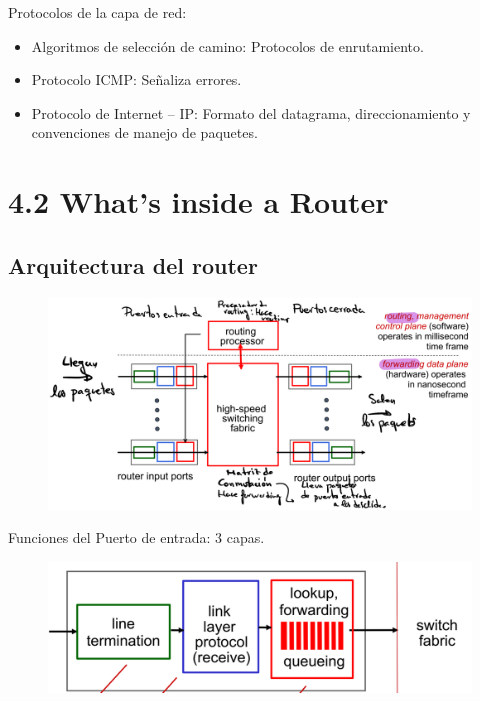 \documentclass[12pt, twoside, openright]{report} %
\begin{document}
Protocolos de la capa de red:

\begin{itemize}
	\item Algoritmos de selección de camino: Protocolos de enrutamiento.
	\item Protocolo ICMP: Señaliza errores.
	\item Protocolo de Internet -- IP: Formato del datagrama,
	      direccionamiento y convenciones de manejo de paquetes.
\end{itemize}

\section{4.2 What's inside a Router}
\subsection{Arquitectura del router}
\begin{figure}[H]
	{\includegraphics[scale=.25]{Untitled 22.png}}
\end{figure}
Funciones del Puerto de entrada: 3 capas.
\begin{figure}[H]
	{\includegraphics[scale=.25]{Untitled 23.png}}
\end{figure}
\end{document}

